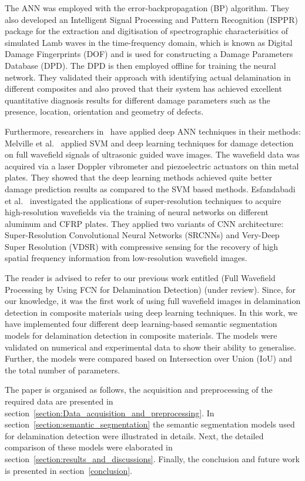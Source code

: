 The ANN was employed with the error-backpropagation (BP) algorithm. 
They also developed an Intelligent Signal Processing and Pattern Recognition (ISPPR) package for the extraction and digitisation of spectrographic characterisitics of simulated Lamb waves in the time-frequency domain, which is known as Digital Damage Fingerprints (DOF) and is used for constructing a Damage Parameters Database (DPD). 
The DPD is then employed offline for training the neural network. 
They validated their approach with identifying actual delamination in different composites and also proved that their system has achieved excellent quantitative diagnosis results for different damage parameters such as the presence, location, orientation and geometry of defects.

Furthermore, researchers in~\cite{Melville2018,esfandabadideep}  have applied deep ANN techniques in their methods:
Melville et al.~\cite{Melville2018} applied SVM and deep learning techniques for damage detection on full wavefield signals of ultrasonic guided wave images. The wavefield data was acquired via a laser Doppler vibrometer and piezoelectric actuators on thin metal plates. 
They showed that the deep learning methods achieved quite better damage prediction results as compared to the SVM based methods. 
Esfandabadi et al.~\cite{esfandabadideep} investigated the applications of super-resolution techniques to acquire high-resolution wavefields via the training of neural networks on different aluminum and CFRP plates. 
They applied two variants of CNN architecture: Super-Resolution Convolutional Neural Networks (SRCNNs) and Very-Deep Super Resolution (VDSR) with compressive sensing for the recovery of high spatial frequency information from low-resolution wavefield images.           

The reader is advised to refer to our previous work entitled (Full Wavefield Processing by Using FCN for Delamination Detection) (under review). Since, for our knowledge, it was the first work of using full wavefield images in delamination detection in composite materials using deep learning techniques. 
In this work, we have implemented four different deep learning-based semantic segmentation models for delamination detection in composite materials.
The models were validated on numerical and experimental data to show their ability to generalise.
Further, the models were compared based on Intersection over Union (IoU) and the total number of parameters.

The paper is organised as follows, the acquisition and preprocessing of the required data are presented in section~\ref{section:Data_acquisition_and_preprocessing}.
In section~\ref{section:semantic_segmentation} the semantic segmentation models used for delamination detection were illustrated in details. 
Next, the detailed comparison of these models were elaborated in section~\ref{section:results_and_discussions}.
Finally, the conclusion and future work is presented in section~\ref{conclusion}.
